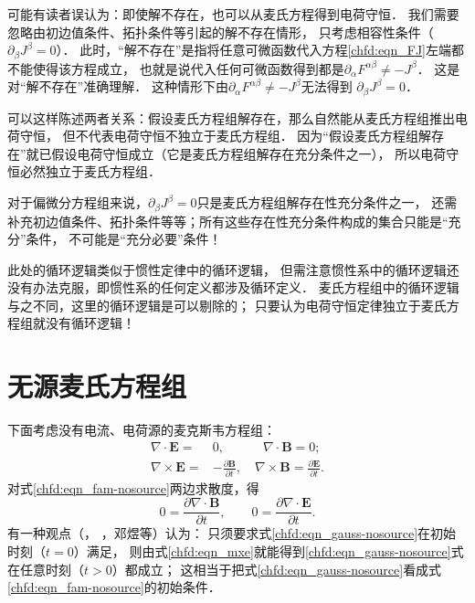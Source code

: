可能有读者误认为：即使解不存在，也可以从麦氏方程得到电荷守恒．
我们需要忽略由初边值条件、拓扑条件等引起的解不存在情形，
只考虑相容性条件（$\partial_{\beta} J^{\beta}=0$）．
此时，“解不存在”是指将任意可微函数代入方程\eqref{chfd:eqn_FJ}左端都不能使得该方程成立，
也就是说代入任何可微函数得到都是$\partial_{\alpha} F^{\alpha\beta} \neq - J^{\beta}$．
这是对“解不存在”准确理解．
这种情形下由$\partial_{\alpha} F^{\alpha\beta} \neq - J^{\beta}$无法得到
$\partial_{\beta} J^{\beta}=0$．


可以这样陈述两者关系：假设麦氏方程组解存在，那么自然能从麦氏方程组推出电荷守恒，
但不代表电荷守恒不独立于麦氏方程组．
因为“假设麦氏方程组解存在”就已假设电荷守恒成立（它是麦氏方程组解存在充分条件之一），
所以电荷守恒必然独立于麦氏方程组．


对于偏微分方程组来说，$\partial_{\beta} J^{\beta}=0$只是麦氏方程组解存在性充分条件之一，
还需补充初边值条件、拓扑条件等等；所有这些存在性充分条件构成的集合只能是“充分”条件，
不可能是“充分必要”条件！


此处的循环逻辑类似于惯性定律中的循环逻辑\cite[p.58]{Einstein-2014}，
但需注意惯性系中的循环逻辑还没有办法克服，即惯性系的任何定义都涉及循环定义．
麦氏方程组中的循环逻辑与之不同，这里的循环逻辑是可以剔除的；
只要认为电荷守恒定律独立于麦氏方程组就没有循环逻辑！




\section{无源麦氏方程组}

下面考虑没有电流、电荷源的麦克斯韦方程组：
\begin{subequations}\label{chfd:eqn_maxwell-nosource}
	\begin{align}
		\nabla \cdot  \boldsymbol{E} =& 0, \qquad\quad
		\nabla \cdot  \boldsymbol{B} = 0;  \label{chfd:eqn_gauss-nosource}\\
		\nabla \times \boldsymbol{E} =& -\frac{\partial \boldsymbol{B}}{\partial t} , \quad
		\nabla \times \boldsymbol{B} = \frac{\partial \boldsymbol{E}}{\partial t}.
		\label{chfd:eqn_fam-nosource}
	\end{align}
\end{subequations}
对式\eqref{chfd:eqn_fam-nosource}两边求散度，得
\begin{equation}\label{chfd:eqn_mxe}
	0 = \frac{\partial \nabla \cdot\boldsymbol{B}}{\partial t} , \qquad
	0 = \frac{\partial \nabla \cdot\boldsymbol{E}}{\partial t}.
\end{equation}
有一种观点（\textcite[p.6]{stratton1941}，
\textcite[p.603]{courant_hilbert-v2}，邓煜\cite{deng-2017}等）认为：
只须要求式\eqref{chfd:eqn_gauss-nosource}在初始时刻（$t=0$）满足，
则由式\eqref{chfd:eqn_mxe}就能得到\eqref{chfd:eqn_gauss-nosource}式在任意时刻（$t>0$）都成立；
这相当于把式\eqref{chfd:eqn_gauss-nosource}看成式\eqref{chfd:eqn_fam-nosource}的初始条件．

